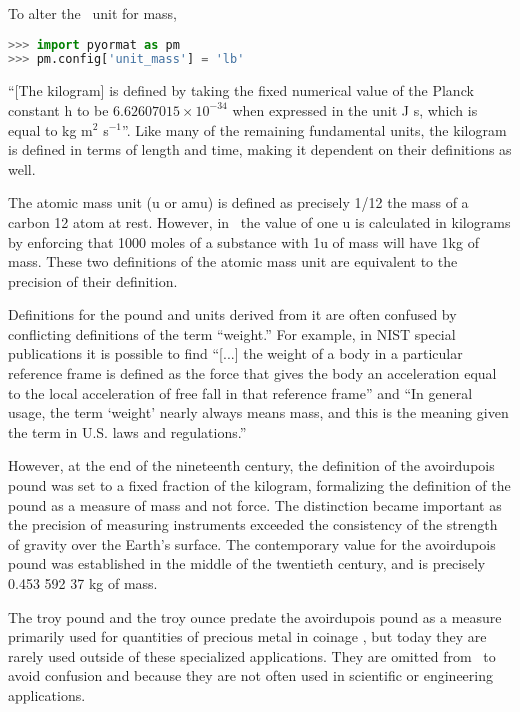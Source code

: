 To alter the \PM\ unit for mass,
\begin{lstlisting}[language=Python]
>>> import pyormat as pm
>>> pm.config['unit_mass'] = 'lb'
\end{lstlisting}

``[The kilogram] is defined by taking the fixed numerical value of the Planck constant h to be $6.62607015\times 10^{-34}$ when expressed in the unit J s, which is equal to kg m$^2$ s$^{-1}$''\cite{bipm}.  Like many of the remaining fundamental units, the kilogram is defined in terms of length and time, making it dependent on their definitions as well.

The atomic mass unit (u or amu) is defined as precisely 1/12 the mass of a carbon 12 atom at rest.  However, in \PM\ the value of one u is calculated in kilograms by enforcing that 1000 moles of a substance with 1u of mass will have 1kg of mass.  These two definitions of the atomic mass unit are equivalent to the precision of their definition\cite[p.209]{bipm}.

Definitions for the pound and units derived from it are often confused by conflicting definitions of the term ``weight.''  For example, in NIST special publications it is possible to find ``[...] the  weight  of  a  body  in  a  particular  reference  frame  is  defined  as  the  force that gives the body an acceleration equal to the local acceleration of free fall in that reference frame''\cite[p.23]{nist:sp811} and ``In general usage, the term `weight' nearly always means mass, and this is the meaning given the term in U.S. laws and regulations.'' \cite[p.10]{nist:sp1038}

However, at the end of the nineteenth century, the definition of the avoirdupois pound was set to a fixed fraction of the kilogram, formalizing the definition of the pound as a measure of mass and not force.  The distinction became important as the precision of measuring instruments exceeded the consistency of the strength of gravity over the Earth's surface.  The contemporary value for the avoirdupois pound was established in the middle of the twentieth century, and is precisely 0.453 592 37 kg of mass.\cite{nbs:59:1959}

The troy pound and the troy ounce predate the avoirdupois pound as a measure primarily used for quantities of precious metal in coinage \cite[p.6]{nbs:sp477}, but today they are rarely used outside of these specialized applications.  They are omitted from \PM\ to avoid confusion and because they are not often used in scientific or engineering applications.

